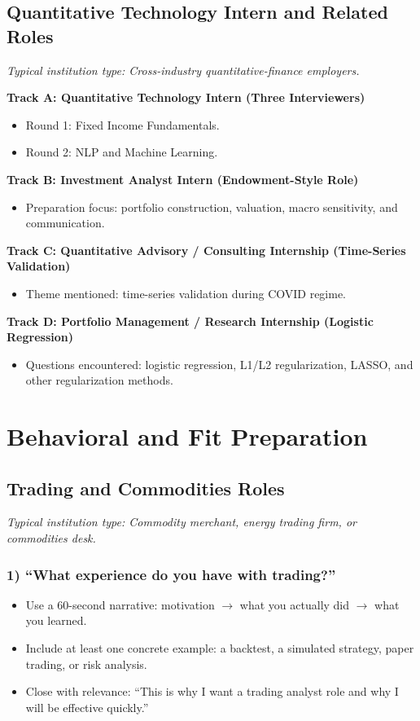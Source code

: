 \documentclass[11pt,letterpaper,openany]{book}
\newcommand{\RoleProfile}[2]{%
  \subsection{#1}%
  \noindent\textit{Typical institution type: #2.}\par
}
\newcommand{\prompt}[1]{\subsubsection*{#1}}
\begin{document}
\RoleProfile{Quantitative Technology Intern and Related Roles}{Cross-industry quantitative-finance employers}
\textbf{Track A: Quantitative Technology Intern (Three Interviewers)}
\begin{itemize}
  \item Round 1: Fixed Income Fundamentals.
  \item Round 2: NLP and Machine Learning.
\end{itemize}

\textbf{Track B: Investment Analyst Intern (Endowment-Style Role)}
\begin{itemize}
  \item Preparation focus: portfolio construction, valuation, macro sensitivity, and communication.
\end{itemize}

\textbf{Track C: Quantitative Advisory / Consulting Internship (Time-Series Validation)}
\begin{itemize}
  \item Theme mentioned: time-series validation during COVID regime.
\end{itemize}

\textbf{Track D: Portfolio Management / Research Internship (Logistic Regression)}
\begin{itemize}
  \item Questions encountered: logistic regression, L1/L2 regularization, LASSO, and other regularization methods.
\end{itemize}

\section{Behavioral and Fit Preparation}

\RoleProfile{Trading and Commodities Roles}{Commodity merchant, energy trading firm, or commodities desk}

\prompt{1) ``What experience do you have with trading?''}
\begin{itemize}
  \item Use a 60-second narrative: motivation $\to$ what you actually did $\to$ what you learned.
  \item Include at least one concrete example: a backtest, a simulated strategy, paper trading, or risk analysis.
  \item Close with relevance: ``This is why I want a trading analyst role and why I will be effective quickly.''
\end{itemize}
\end{document}
